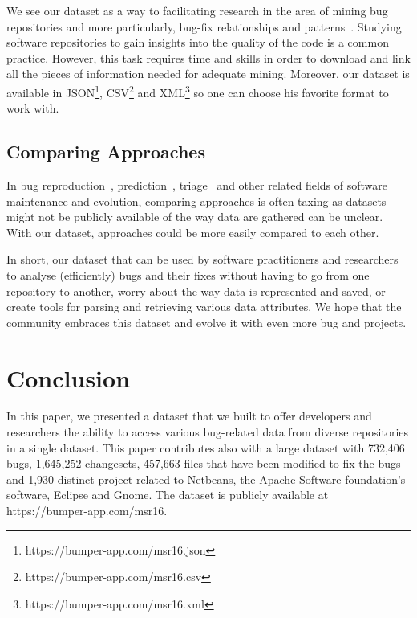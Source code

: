 \documentclass{sig-alternate-05-2015}
\begin{document}
We see our dataset as a way to facilitating research in the area
of mining bug repositories and more particularly, bug-fix relationships and patterns~\cite{Kim2013e,Saha2014,Martinez2014}. Studying software repositories to gain insights
into the quality of the code is a common practice.
However, this task requires
time and skills in order to download and link all the pieces of information
needed for adequate mining. Moreover, our dataset is available in JSON\footnote{https://bumper-app.com/msr16.json}, CSV\footnote{https://bumper-app.com/msr16.csv} and XML\footnote{https://bumper-app.com/msr16.xml} so one can choose his favorite format to work with.

\subsection{Comparing Approaches}
\label{sub:Comparing Approaches}

In bug reproduction~\cite{Chen2013,Nayrolles2015}, prediction~\cite{Kamei2010,Bhattacharya2011}, triage~\cite{Anvik2006,Jeong2009,Kong2011} and other related fields of software maintenance and evolution, comparing approaches is often taxing as datasets might not be publicly available of the way data are gathered can be unclear.
With our dataset, approaches could be more easily compared to each other.

In short, our dataset that can be used by software practitioners
and researchers to analyse (efficiently) bugs and their fixes without having
to go from one repository to another, worry about the way data is represented
and saved, or create tools for parsing and retrieving various data attributes.
We hope that the community embraces this dataset and evolve it with even more bug and projects.

\section{Conclusion}
\label{sec:Conclusion}

In this paper, we presented a dataset that we built to offer developers and
researchers the ability to access various bug-related data
from diverse repositories in a single dataset. This paper
contributes also with a large dataset with 732,406 bugs,
1,645,252 changesets, 457,663 files that have been modified to fix the bugs
and 1,930 distinct project
related to Netbeans, the Apache Software foundation's
software, Eclipse and Gnome. The dataset is publicly available at https://bumper-app.com/msr16.
\end{document}
